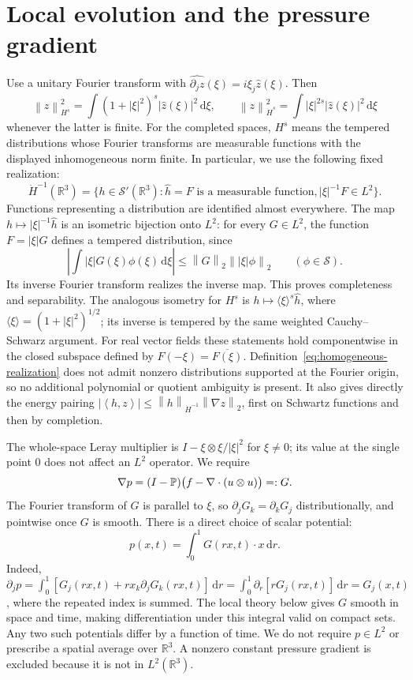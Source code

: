\documentclass[11pt,a4paper]{article}
\theoremstyle{definition}\newtheorem{definition}[theorem]{Definition}
\theoremstyle{remark}\newtheorem{remark}[theorem]{Remark}
\newcommand{\R}{\mathbb R}\newcommand{\TT}{\mathbb T^3}
\newcommand{\dd}{\,\mathrm d}\newcommand{\eps}{\varepsilon}
\newcommand{\norm}[1]{\left\lVert#1\right\rVert}
\newcommand{\ip}[2]{\left\langle#1,#2\right\rangle}
\begin{document}
\section{Local evolution and the pressure gradient}
Use a unitary Fourier transform with $\widehat{\partial_j z}(\xi)=i\xi_j\widehat z(\xi)$. Then
\[
 \norm{z}_{H^s}^2=\int(1+|\xi|^2)^s|\widehat z(\xi)|^2\dd\xi,
 \qquad
 \norm{z}_{\dot H^s}^2=\int|\xi|^{2s}|\widehat z(\xi)|^2\dd\xi
\]
whenever the latter is finite. For the completed spaces, $H^s$ means the tempered distributions whose Fourier transforms are measurable functions with the displayed inhomogeneous norm finite. In particular, we use the following fixed realization:
\begin{equation}\label{eq:homogeneous-realization}
 \dot H^{-1}(\R^3)
 =\{h\in\mathcal S'(\R^3):\widehat h=F\text{ is a measurable function},
                         |\xi|^{-1}F\in L^2\}.
\end{equation}
Functions representing a distribution are identified almost everywhere. The map $h\mapsto|\xi|^{-1}\widehat h$ is an isometric bijection onto $L^2$: for every $G\in L^2$, the function $F=|\xi|G$ defines a tempered distribution, since
\[
 \left|\int |\xi|G(\xi)\phi(\xi)\dd\xi\right|
 \le\norm{G}_2\norm{|\xi|\phi}_2\qquad(\phi\in\mathcal S).
\]
Its inverse Fourier transform realizes the inverse map. This proves completeness and separability. The analogous isometry for $H^s$ is $h\mapsto\langle\xi\rangle^s\widehat h$, where $\langle\xi\rangle=(1+|\xi|^2)^{1/2}$; its inverse is tempered by the same weighted Cauchy--Schwarz argument. For real vector fields these statements hold componentwise in the closed subspace defined by $F(-\xi)=\overline{F(\xi)}$. Definition~\eqref{eq:homogeneous-realization} does not admit nonzero distributions supported at the Fourier origin, so no additional polynomial or quotient ambiguity is present. It also gives directly the energy pairing
$|\ip{h}{z}|\le\norm{h}_{\dot H^{-1}}\norm{\nabla z}_2$, first on Schwartz functions and then by completion.

The whole-space Leray multiplier is $I-\xi\otimes\xi/|\xi|^2$ for $\xi\ne0$; its value at the single point $0$ does not affect an $L^2$ operator. We require
\begin{equation}\label{eq:Rpressure}
 \nabla p=(I-\mathbb P)\bigl(f-\nabla\cdot(u\otimes u)\bigr)=:G.
\end{equation}
The Fourier transform of $G$ is parallel to $\xi$, so $\partial_jG_k=\partial_kG_j$ distributionally, and pointwise once $G$ is smooth. There is a direct choice of scalar potential:
\[
 p(x,t)=\int_0^1G(rx,t)\cdot x\dd r.
\]
Indeed,
$\partial_jp=\int_0^1[G_j(rx,t)+r x_k\partial_jG_k(rx,t)]\dd r
=\int_0^1\partial_r[rG_j(rx,t)]\dd r=G_j(x,t)$,
where the repeated index is summed. The local theory below gives $G$ smooth in space and time, making differentiation under this integral valid on compact sets. Any two such potentials differ by a function of time. We do not require $p\in L^2$ or prescribe a spatial average over $\R^3$. A nonzero constant pressure gradient is excluded because it is not in $L^2(\R^3)$.
\end{document}
